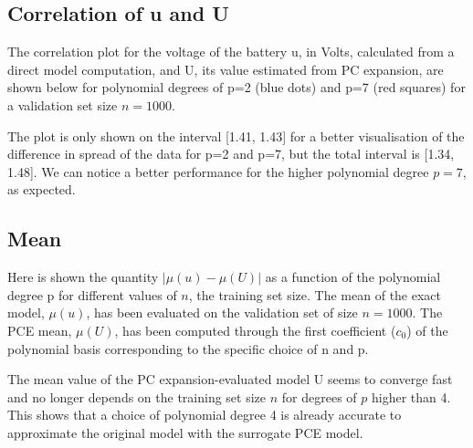 \documentclass[a4paper,12pt]{article} %
\begin{document}
\subsection{Correlation of u and U}
The correlation plot for the voltage of the battery u, in Volts, calculated from a direct model computation, and U, its value estimated from PC expansion, are shown below for polynomial degrees of p=2 (blue dots) and p=7 (red squares) for a validation set size $n=1000$.
\begin{center}
\end{center}
The plot is only shown on the interval [1.41, 1.43] for a better visualisation of the difference in spread of the data for p=2 and p=7, but the total interval is [1.34, 1.48]. We can notice a better performance for the higher polynomial degree $p=7$, as expected.

\subsection{Mean}
Here is shown the quantity $\vert \mu(u) - \mu(U) \vert$ as a function of the polynomial degree p for different values of $n$, the training set size. The mean of the exact model, $\mu(u)$, has been evaluated on the validation set of size $n=1000$. The PCE mean, $\mu(U)$, has been computed through the first coefficient ($c_0$) of the polynomial basis corresponding to the specific choice of n and p.

\begin{figure}[H]
\centering
{}
\end{figure}
The mean value of the PC expansion-evaluated model U seems to converge fast and no longer depends on the training set size $n$ for degrees of $p$ higher than 4. This shows that a choice of polynomial degree 4 is already accurate to approximate the original model with the surrogate PCE model.
\end{document}

